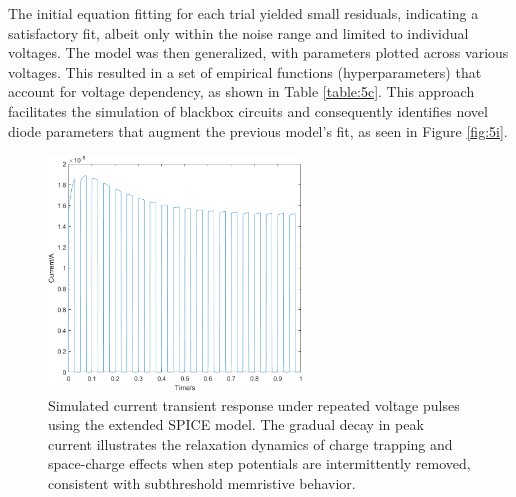 \noindent The initial equation fitting for each trial yielded small residuals, indicating a satisfactory fit, albeit only within the noise range and limited to individual voltages. The model was then generalized, with parameters plotted across various voltages. This resulted in a set of empirical functions (hyperparameters) that account for voltage dependency, as shown in Table \ref{table:5c}. This approach facilitates the simulation of blackbox circuits and consequently identifies novel diode parameters that augment the previous model's fit, as seen in Figure \ref{fig:5i}.\\



\begin{figure}[htbp!] 
    \centering    
    \includegraphics[width=0.6\textwidth]{Chapter5/Figs/j.png}
    \caption[Simulated current transient response under repeated voltage pulses using the extended SPICE model.]{Simulated current transient response under repeated voltage pulses using the extended SPICE model. The gradual decay in peak current illustrates the relaxation dynamics of charge trapping and space-charge effects when step potentials are intermittently removed, consistent with subthreshold memristive behavior.}
    \label{fig:5j}
\end{figure}

